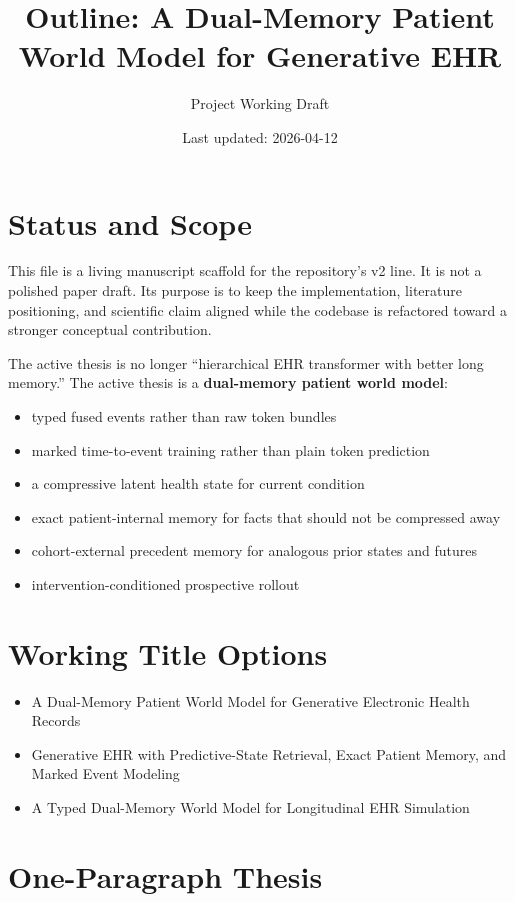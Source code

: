 \documentclass[11pt]{article}
\title{Outline: A Dual-Memory Patient World Model for Generative EHR}
\author{Project Working Draft}
\date{Last updated: 2026-04-12}
\begin{document}
\maketitle

\section{Status and Scope}

This file is a living manuscript scaffold for the repository's v2 line. It is
not a polished paper draft. Its purpose is to keep the implementation,
literature positioning, and scientific claim aligned while the codebase is
refactored toward a stronger conceptual contribution.

The active thesis is no longer ``hierarchical EHR transformer with better long
memory.'' The active thesis is a \textbf{dual-memory patient world model}:
\begin{itemize}
    \item typed fused events rather than raw token bundles
    \item marked time-to-event training rather than plain token prediction
    \item a compressive latent health state for current condition
    \item exact patient-internal memory for facts that should not be compressed away
    \item cohort-external precedent memory for analogous prior states and futures
    \item intervention-conditioned prospective rollout
\end{itemize}

\section{Working Title Options}

\begin{itemize}
    \item A Dual-Memory Patient World Model for Generative Electronic Health Records
    \item Generative EHR with Predictive-State Retrieval, Exact Patient Memory, and Marked Event Modeling
    \item A Typed Dual-Memory World Model for Longitudinal EHR Simulation
\end{itemize}

\section{One-Paragraph Thesis}
\end{document}
